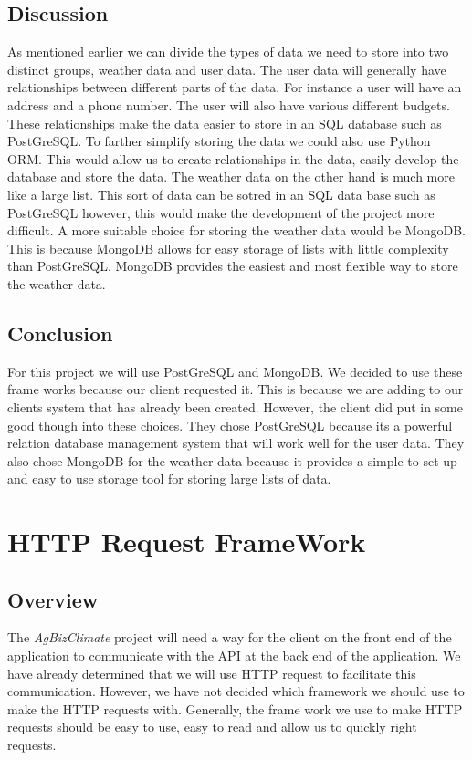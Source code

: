 \documentclass[letterpaper,10pt]{article}
\begin{document}
	\subsection{Discussion}
		As mentioned earlier we can divide the types of data we need to store into two distinct groups, weather data and user data. The user data will generally have relationships between different parts of the data. For instance a user will have an address and a phone number. The user will also have various different budgets. These relationships make the data easier to store in an SQL database such as PostGreSQL. To farther simplify storing the data we could also use Python ORM. This would allow us to create relationships in the data, easily develop the database and store the data. The weather data on the other hand is much more like a large list. This sort of data can be sotred in an SQL data base such as PostGreSQL however, this would make the development of the project more difficult. A more suitable choice for storing the weather data would be MongoDB. This is because MongoDB allows for easy storage of lists with little complexity than PostGreSQL. MongoDB provides the easiest and most flexible way to store the weather data.\\
	\subsection{Conclusion}
		For this project we will use PostGreSQL and MongoDB. We decided to use these frame works because our client requested it. This is because we are adding to our clients system that has already been created. However, the client did put in some good though into these choices. They chose PostGreSQL because its a powerful relation database management system that will work well for the user data. They also chose MongoDB for the weather data because it provides a simple to set up and easy to use storage tool for storing large lists of data.\\
	
	
\section{HTTP Request FrameWork}
	\subsection{Overview}
		The \textit{AgBizClimate} project will need a way for the client on the front end of the application to communicate with the API at the back end of the application. We have already determined that we will use HTTP request to facilitate this communication. However, we have not decided which framework we should use to make the HTTP requests with. Generally, the frame work we use to make HTTP requests should be easy to use, easy to read and allow us to quickly right requests.\\
\end{document}
